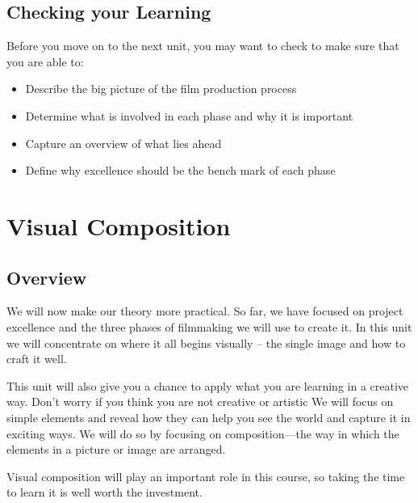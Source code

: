 \documentclass[
]{book}
\begin{document}
\hypertarget{checking-your-learning-1}{%
\section*{Checking your Learning}\label{checking-your-learning-1}}

\begin{progress}
Before you move on to the next unit, you may want to check to make sure that you are able to:

\begin{itemize}
\item
  Describe the big picture of the film production process
\item
  Determine what is involved in each phase and why it is important
\item
  Capture an overview of what lies ahead
\item
  Define why excellence should be the bench mark of each phase
\end{itemize}
\end{progress}

\hypertarget{visual-composition}{%
\chapter{Visual Composition}\label{visual-composition}}

\hypertarget{overview-2}{%
\section*{Overview}\label{overview-2}}

We will now make our theory more practical. So far, we have focused on project excellence and the three phases of filmmaking we will use to create it. In this unit we will concentrate on where it all begins visually -- the single image and how to craft it well.

This unit will also give you a chance to apply what you are learning in a creative way. Don't worry if you think you are not creative or artistic We will focus on simple elements and reveal how they can help you see the world and capture it in exciting ways. We will do so by focusing on composition---the way in which the elements in a picture or image are arranged.

Visual composition will play an important role in this course, so taking the time to learn it is well worth the investment.
\end{document}
